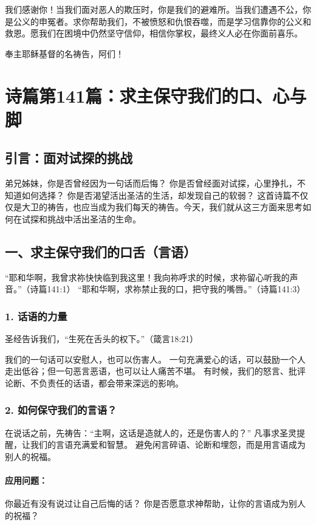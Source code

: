 \documentclass[a4paper, 12pt]{article}
\begin{document}
我们感谢你！当我们面对恶人的欺压时，你是我们的避难所。当我们遭遇不公，你是公义的申冤者。求你帮助我们，不被愤怒和仇恨吞噬，而是学习信靠你的公义和救恩。愿我们在困境中仍然坚守信仰，相信你掌权，最终义人必在你面前喜乐。

奉主耶稣基督的名祷告，阿们！
\newpage
\section{诗篇第141篇：求主保守我们的口、心与脚}
\subsection*{引言：面对试探的挑战}
弟兄姊妹，你是否曾经因为一句话而后悔？
你是否曾经面对试探，心里挣扎，不知道如何选择？
你是否渴望活出圣洁的生活，却发现自己的软弱？
这首诗篇不仅仅是大卫的祷告，也应当成为我们每天的祷告。今天，我们就从这三方面来思考如何在试探和挑战中活出圣洁的生命。

\subsection*{一、求主保守我们的口舌（言语）}
“耶和华啊，我曾求祢快快临到我这里！我向祢呼求的时候，求祢留心听我的声音。”（诗篇141:1）
“耶和华啊，求祢禁止我的口，把守我的嘴唇。”（诗篇141:3）

\subsubsection*{1. 话语的力量}
圣经告诉我们，“生死在舌头的权下。”（箴言18:21）

我们的一句话可以安慰人，也可以伤害人。
一句充满爱心的话，可以鼓励一个人走出低谷；但一句恶言恶语，也可以让人痛苦不堪。
有时候，我们的怒言、批评论断、不负责任的话语，都会带来深远的影响。
\subsubsection*{2. 如何保守我们的言语？}
在说话之前，先祷告：“主啊，这话是造就人的，还是伤害人的？”
凡事求圣灵提醒，让我们的言语充满爱和智慧。
避免闲言碎语、论断和埋怨，而是用言语成为别人的祝福。
\paragraph*{应用问题：}

你最近有没有说过让自己后悔的话？
你是否愿意求神帮助，让你的言语成为别人的祝福？
\end{document}
